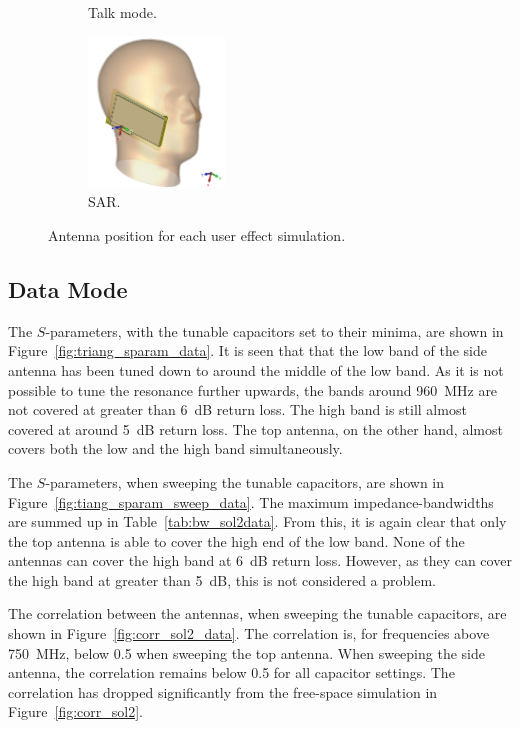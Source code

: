 \begin{figure}[htbp]
\begin{subfigure}[b]{0.24\linewidth}
        \caption{Talk mode.}
    \end{subfigure}
    \begin{subfigure}[b]{0.24\linewidth}
        \centering
        \includegraphics[width=\linewidth,height=4cm,keepaspectratio]{img/tech_sol/trianglefeed/sar/3d.PNG}
        \caption{SAR.}
    \end{subfigure}
    \caption{Antenna position for each user effect simulation.}
    \label{fig:triang_positions}
\end{figure}

\FloatBarrier
\subsection{Data Mode}
The $S$-parameters, with the tunable capacitors set to their minima, are shown in Figure~\ref{fig:triang_sparam_data}. It is seen that that the low band of the side antenna has been tuned down to around the middle of the low band. As it is not possible to tune the resonance further upwards, the bands around \SI{960}{MHz} are not covered at greater than \SI{6}{dB} return loss. The high band is still almost covered at around \SI{5}{dB} return loss. The top antenna, on the other hand, almost covers both the low and the high band simultaneously.

The $S$-parameters, when sweeping the tunable capacitors, are shown in Figure~\ref{fig:tiang_sparam_sweep_data}. The maximum impedance-bandwidths are summed up in Table~\ref{tab:bw_sol2data}. From this, it is again clear that only the top antenna is able to cover the high end of the low band. None of the antennas can cover the high band at \SI{6}{dB} return loss. However, as they can cover the high band at greater than \SI{5}{dB}, this is not considered a problem.

The correlation between the antennas, when sweeping the tunable capacitors, are shown in Figure~\ref{fig:corr_sol2_data}. The correlation is, for frequencies above \SI{750}{MHz}, below 0.5 when sweeping the top antenna. When sweeping the side antenna, the correlation remains below 0.5 for all capacitor settings. The correlation has dropped significantly from the free-space simulation in Figure~\ref{fig:corr_sol2}.

